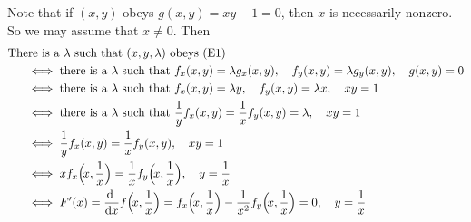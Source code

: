 \begin{solution}
Note that if $(x,y)$ obeys $g(x,y)=xy-1=0$, then $x$ is necessarily nonzero.
So we may assume that $x\ne 0$. Then
\begin{align*}
&\text{There is a $\la$ such that $(x,y,\la)$ obeys (E1)} \\
&\hskip0.2in
  \iff \text{there is a $\la$ such that }
        f_x(x,y)=\la g_x(x,y),\quad f_y(x,y)=\la g_y(x,y),\quad g(x,y)=0 \\
&\hskip0.2in
  \iff \text{there is a $\la$ such that }
           f_x(x,y)=\la y,\quad f_y(x,y)=\la x,\quad xy=1 \\
&\hskip0.2in
  \iff \text{there is a $\la$ such that }
      \frac{1}{y}f_x(x,y)= \frac{1}{x} f_y(x,y)=\la ,\quad xy=1 \\
&\hskip0.2in
  \iff  \frac{1}{y}f_x(x,y)= \frac{1}{x} f_y(x,y) ,\quad xy=1 \\
&\hskip0.2in
  \iff  xf_x\Big(\!x,\frac{1}{x}\Big)= \frac{1}{x} 
        f_y\Big(\!x,\frac{1}{x}\Big) ,\quad y=\frac{1}{x} \\
&\hskip0.2in
  \iff F'(x) = \diff{}{x} f\Big(\!x,\frac{1}{x}\Big) 
             = f_x\Big(\!x,\frac{1}{x}\Big)
              -\frac{1}{x^2}f_y\Big(\!x,\frac{1}{x}\Big)
             =0,\quad y=\frac{1}{x}
\end{align*}


\end{solution}


